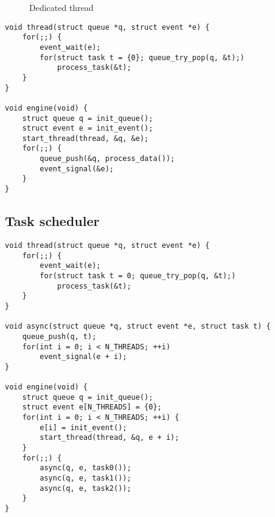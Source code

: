 \begin{figure}[ht]
    \centering
    \caption{Dedicated thread}
    \label{fig:conc:dedicated}
\end{figure}

\begin{lstlisting}[style=c]
void thread(struct queue *q, struct event *e) {
    for(;;) {
        event_wait(e);
        for(struct task t = {0}; queue_try_pop(q, &t);)
            process_task(&t);
    }
}

void engine(void) {
    struct queue q = init_queue();
    struct event e = init_event();
    start_thread(thread, &q, &e);
    for(;;) {
        queue_push(&q, process_data());
        event_signal(&e);
    }
}
\end{lstlisting}

\subsection{Task scheduler}

\begin{lstlisting}[style=c]
void thread(struct queue *q, struct event *e) {
    for(;;) {
        event_wait(e);
        for(struct task t = 0; queue_try_pop(q, &t);)
            process_task(&t);
    }
}

void async(struct queue *q, struct event *e, struct task t) {
    queue_push(q, t);
    for(int i = 0; i < N_THREADS; ++i)
        event_signal(e + i);
}

void engine(void) {
    struct queue q = init_queue();
    struct event e[N_THREADS] = {0};
    for(int i = 0; i < N_THREADS; ++i) {
        e[i] = init_event();
        start_thread(thread, &q, e + i);
    }
    for(;;) {
        async(q, e, task0());
        async(q, e, task1());
        async(q, e, task2());
    }
}
\end{lstlisting}
